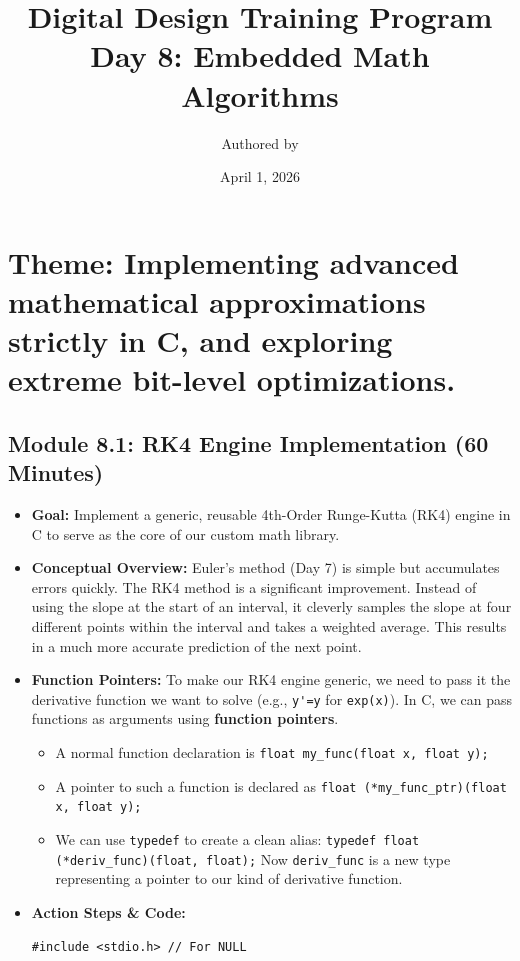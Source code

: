 \documentclass[11pt,a4paper]{article}
\title{Digital Design Training Program \\ \large Day 8: Embedded Math Algorithms}
\author{Authored by }
\date{April 1, 2026}
\begin{document}
\maketitle

\section*{Theme: Implementing advanced mathematical approximations strictly in C, and exploring extreme bit-level optimizations.}

\subsection*{Module 8.1: RK4 Engine Implementation (60 Minutes)}

\begin{itemize}
    \item \textbf{Goal:} Implement a generic, reusable 4th-Order Runge-Kutta (RK4) engine in C to serve as the core of our custom math library.
    \item \textbf{Conceptual Overview:} Euler's method (Day 7) is simple but accumulates errors quickly. The RK4 method is a significant improvement. Instead of using the slope at the start of an interval, it cleverly samples the slope at four different points within the interval and takes a weighted average. This results in a much more accurate prediction of the next point.
    \item \textbf{Function Pointers:} To make our RK4 engine generic, we need to pass it the derivative function we want to solve (e.g., \verb|y'=y| for \verb|exp(x)|). In C, we can pass functions as arguments using \textbf{function pointers}.
    \begin{itemize}
        \item A normal function declaration is \verb|float my_func(float x, float y);|
        \item A pointer to such a function is declared as \verb|float (*my_func_ptr)(float x, float y);|
        \item We can use \verb|typedef| to create a clean alias: \verb|typedef float (*deriv_func)(float, float);| Now \verb|deriv_func| is a new type representing a pointer to our kind of derivative function.
    \end{itemize}
    \item \textbf{Action Steps \& Code:}
\begin{lstlisting}[caption={Code for Module 8.1: Generic RK4 Solver}]
#include <stdio.h> // For NULL


\end{lstlisting}
\end{itemize}
\end{document}
